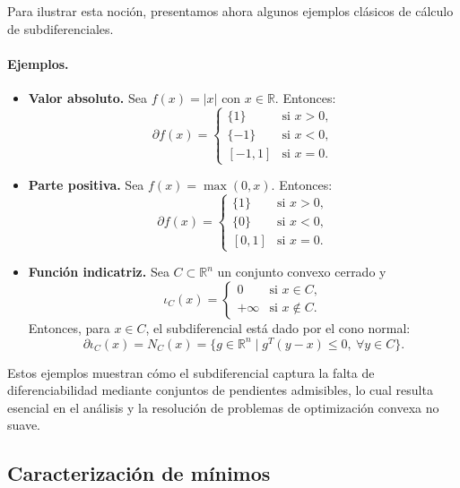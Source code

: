 \documentclass[12pt]{book}
\theoremstyle{definition}
\theoremstyle{plain}
\theoremstyle{remark}
\begin{document}
Para ilustrar esta noción, presentamos ahora algunos ejemplos clásicos de cálculo de subdiferenciales.

\paragraph{Ejemplos.}

\begin{itemize}
    \item \textbf{Valor absoluto.} Sea \( f(x) = |x| \) con \( x \in \mathbb{R} \). Entonces:
    \[
    \partial f(x) =
    \begin{cases}
        \{1\} & \text{si } x > 0, \\
        \{-1\} & \text{si } x < 0, \\
        [-1,1] & \text{si } x = 0.
    \end{cases}
    \]

    \item \textbf{Parte positiva.} Sea \( f(x) = \max(0,x) \). Entonces:
    \[
    \partial f(x) =
    \begin{cases}
        \{1\} & \text{si } x > 0, \\
        \{0\} & \text{si } x < 0, \\
        [0,1] & \text{si } x = 0.
    \end{cases}
    \]

    \item \textbf{Función indicatriz.} Sea \( C \subset \mathbb{R}^n \) un conjunto convexo cerrado y
    \[
    \iota_C(x) =
    \begin{cases}
        0 & \text{si } x \in C, \\
        +\infty & \text{si } x \notin C.
    \end{cases}
    \]
    Entonces, para \( x \in C \), el subdiferencial está dado por el cono normal:
    \[
    \partial \iota_C(x) = N_C(x) = \{ g \in \mathbb{R}^n \mid g^T (y - x) \leq 0, \ \forall y \in C \}.
    \]
\end{itemize}

Estos ejemplos muestran cómo el subdiferencial captura la falta de diferenciabilidad mediante conjuntos de pendientes admisibles, lo cual resulta esencial en el análisis y la resolución de problemas de optimización convexa no suave.

\subsection{Caracterización de mínimos} %
\end{document}
